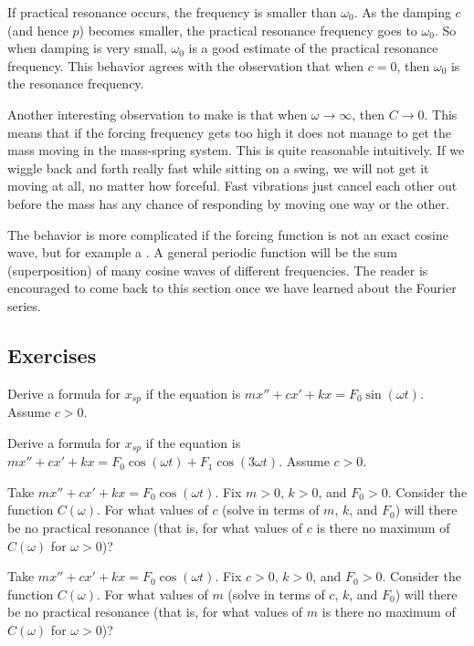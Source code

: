 If practical resonance occurs, the frequency is smaller than
$\omega_0$.  As the damping $c$ (and hence $p$) becomes smaller, the
practical resonance frequency
goes to $\omega_0$.  So when damping is very
small, $\omega_0$ is a good estimate of the practical resonance frequency.  This
behavior
agrees with the observation that when $c=0$, then $\omega_0$ is the resonance
frequency.

Another interesting observation to make is that when $\omega \to \infty$,
then $C \to 0$.  This means that if the forcing frequency gets too high it
does not manage to get the mass moving in the mass-spring system.  This is
quite reasonable intuitively.
If we wiggle back and forth really fast while sitting on a swing, we will
not get it moving at all, no matter how forceful.  Fast
vibrations just cancel each other out before the mass has any chance of
responding by moving one way or the other.

The behavior is more complicated if the forcing function is not an
exact cosine wave, but for example a .
A general periodic function will be the sum (superposition) of many
cosine waves of different frequencies.
The reader is encouraged to come
back to this section once we have learned about the Fourier series.

\subsection{Exercises}

\begin{exercise}
Derive a formula for $x_{sp}$ if the equation is
$m x'' + c x' + kx = F_0 \sin (\omega t)$.  Assume $c > 0$.
\end{exercise}

\begin{exercise}
Derive a formula for $x_{sp}$ if the equation is
$m x'' + c x' + kx = F_0 \cos (\omega t) + F_1 \cos (3\omega t)$.
Assume $c > 0$.
\end{exercise}

\begin{exercise}
Take $m x'' + c x' + kx = F_0 \cos (\omega t)$.
Fix $m > 0$, $k > 0$, and $F_0 > 0$.  Consider the function $C(\omega)$.
For what values of $c$ (solve in terms of $m$, $k$, and $F_0$) will there be no
practical resonance (that is, for what values of $c$ is there no maximum of
$C(\omega)$ for $\omega > 0$)?
\end{exercise}

\begin{exercise}
Take $m x'' + c x' + kx = F_0 \cos (\omega t)$.
Fix $c > 0$, $k > 0$, and $F_0 > 0$.  Consider the function $C(\omega)$.
For what values of $m$ (solve in terms of $c$, $k$, and $F_0$) will there be no
practical resonance (that is, for what values of $m$ is there no maximum of
$C(\omega)$ for $\omega > 0$)?
\end{exercise}

